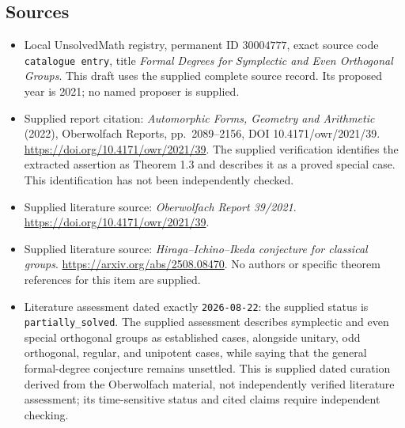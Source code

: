 \documentclass[11pt]{article}
\begin{document}
\subsection{Sources}
\begin{itemize}
\item Local UnsolvedMath registry, permanent ID \(30004777\), exact source code \texttt{catalogue entry}, title \emph{Formal Degrees for Symplectic and Even Orthogonal Groups}. This draft uses the supplied complete source record. Its proposed year is 2021; no named proposer is supplied.
\item Supplied report citation: \emph{Automorphic Forms, Geometry and Arithmetic} (2022), Oberwolfach Reports, pp.\ 2089--2156, DOI 10.4171/owr/2021/39. \url{https://doi.org/10.4171/owr/2021/39}. The supplied verification identifies the extracted assertion as Theorem 1.3 and describes it as a proved special case. This identification has not been independently checked.
\item Supplied literature source: \emph{Oberwolfach Report 39/2021}. \url{https://doi.org/10.4171/owr/2021/39}.
\item Supplied literature source: \emph{Hiraga--Ichino--Ikeda conjecture for classical groups}. \url{https://arxiv.org/abs/2508.08470}. No authors or specific theorem references for this item are supplied.
\item Literature assessment dated exactly \texttt{2026-08-22}: the supplied status is \texttt{partially\_solved}. The supplied assessment describes symplectic and even special orthogonal groups as established cases, alongside unitary, odd orthogonal, regular, and unipotent cases, while saying that the general formal-degree conjecture remains unsettled. This is supplied dated curation derived from the Oberwolfach material, not independently verified literature assessment; its time-sensitive status and cited claims require independent checking.
\end{itemize}
\end{document}
